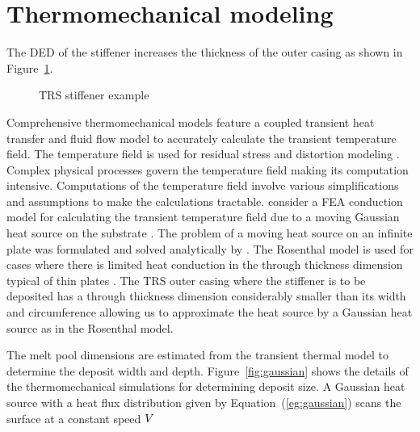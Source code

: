 \section{Thermomechanical modeling}
\label{sec:thermomech}

The \ac{DED} of the stiffener increases the thickness of the outer casing as shown in Figure~\ref{fig:TRSoverview}. 

\begin{figure}[h!]
	\centering
	 \hspace{0.1\textwidth}%
	\caption{TRS stiffener example}
	\label{fig:TRSoverview}
\end{figure}

Comprehensive thermomechanical models feature a coupled transient heat transfer and fluid flow model to accurately calculate the transient temperature field. The temperature field is used for residual stress and distortion modeling \cite{Mukherjee2017}. Complex physical processes govern the temperature field making its computation intensive. Computations of the temperature field involve various simplifications and assumptions to make the calculations tractable. \citeauthor{Manvatkar2011} consider a \ac{FEA} conduction model for calculating the transient temperature field due to a moving Gaussian heat source on the substrate \cite{Manvatkar2011}. The problem of a moving heat source on an infinite plate was formulated and solved analytically by \citeauthor{rosenthal1946theory} \cite{rosenthal1946theory}. The Rosenthal model is used for cases where there is limited heat conduction in the through thickness dimension typical of thin plates \cite{Goldak1984}. The \ac{TRS} outer casing where the stiffener is to be deposited has a through thickness dimension considerably smaller than its width and circumference allowing us to approximate the heat source by a Gaussian heat source as in the Rosenthal model.

The melt pool dimensions are estimated from the transient thermal model to determine the deposit width and depth. Figure~\ref{fig:gaussian} shows the details of the thermomechanical simulations for determining deposit size. A Gaussian heat source with a heat flux distribution given by Equation~(\ref{eg:gaussian}) scans the surface at a constant speed ${\color{black}{V}}$ \cite{rosenthal1946theory}

